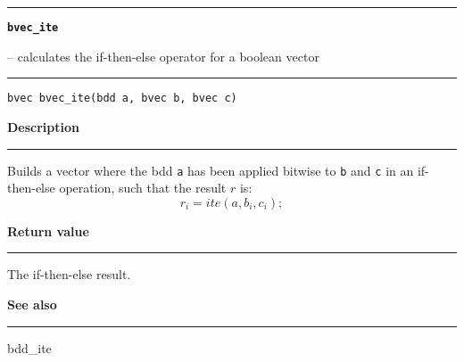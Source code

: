 \begin{minipage}{\textwidth}

\noindent\begin{minipage}{\textwidth}
\rule{\textwidth}{0.5mm}
{\tt\bf bvec\_ite }
\--- calculates the if-then-else operator for a boolean vector  \hspace{\fill}
\\\rule[1.5ex]{\textwidth}{0.5mm}
\end{minipage}

\noindent\begin{verbatim}
bvec bvec_ite(bdd a, bvec b, bvec c) 
\end{verbatim}

\vspace{\parsep}\noindent
{\bf Description}\\\rule[1.5ex]{\textwidth}{0.2mm}\vspace{-1.5ex}\setlength{\parindent}{1em}
Builds a vector where the bdd {\tt a} has been applied bitwise to
           {\tt b} and {\tt c} in an if-then-else operation, such that
	   the result $r$ is:
	   \[
	     r_i = ite(a,b_i,c_i);
	   \] 

\setlength{\parindent}{0em}\vspace{\parsep}\vspace{\baselineskip}\noindent
{\bf Return value}\\\rule[1.5ex]{\textwidth}{0.2mm}\vspace{-1.5ex}
The if-then-else result. 

\vspace{\parsep}\vspace{\baselineskip}\noindent
{\bf See also}\\\rule[1.5ex]{\textwidth}{0.2mm}\vspace{-1.5ex}
bdd\_ite 
\end{minipage}
\vspace{8ex}
